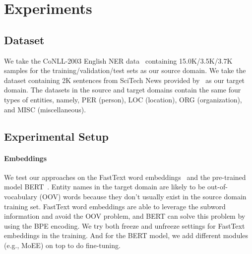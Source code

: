 \documentclass[11pt,a4paper]{article}
\begin{document}
\section{Experiments}
\subsection{Dataset}
We take the CoNLL-2003 English NER data~\cite{sang2003introduction} containing 15.0K/3.5K/3.7K samples for the training/validation/test sets as our source domain. We take the dataset containing 2K sentences from SciTech News provided by~\citet{jia2019cross} as our target domain. The datasets in the source and target domains contain the same four types of entities, namely, PER (person), LOC (location), ORG (organization), and MISC (miscellaneous).

\subsection{Experimental Setup}
\paragraph{Embeddings} 
We test our approaches on the FastText word embeddings~\cite{bojanowski2017enriching} and the pre-trained model BERT~\cite{devlin2019bert}. 
Entity names in the target domain are likely to be out-of-vocabulary (OOV) words because they don't usually exist in the source domain training set. FastText word embeddings are able to leverage the subword information and avoid the OOV problem, and BERT can solve this problem by using the BPE encoding. We try both freeze and unfreeze settings for FastText embeddings in the training. And for the BERT model, we add different modules (e.g., MoEE) on top to do fine-tuning.
\end{document}
